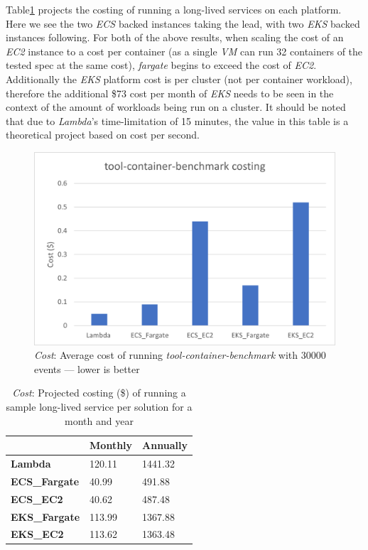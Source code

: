 Table\ref{fig:cost_projected} projects the costing of running a long-lived services on each platform. Here we see the two \textit{ECS} backed instances taking the lead,
with two \textit{EKS} backed instances following. For both of the above results, when scaling the cost of an \textit{EC2} instance to a cost per container
(as a single \textit{VM} can run 32 containers of the tested spec at the same cost), \textit{fargate} begins to exceed the cost of \textit{EC2}.
Additionally the \textit{EKS} platform cost is per cluster (not per container workload), therefore the additional \$73 cost per month of \textit{EKS} needs to be seen in the context of the amount of workloads being run on a cluster.
It should be noted that due to \textit{Lambda}'s time-limitation of 15 minutes, the value in this table is a theoretical project based on cost per second.

\begin{figure}[htbp]
  \includegraphics[width=\textwidth]{images/cost-workload.png}
  \caption{\emph{Cost}: Average cost of running \emph{tool-container-benchmark} with 30000 events --- lower is better}
  \label{fig:cost_workload}
\end{figure}

\begin{table}[htbp]
  \caption{\emph{Cost}: Projected costing (\$) of running a sample long-lived service per solution for a month and year}
  \small
  \begin{tabularx}{1\textwidth}{X | X | X }
    \space            & \bf{Monthly} & \bf{Annually} \\
    \hline
    \bf{Lambda      } & 120.11       & 1441.32       \\
    \bf{ECS\_Fargate} & 40.99        & 491.88        \\
    \bf{ECS\_EC2    } & 40.62        & 487.48        \\
    \bf{EKS\_Fargate} & 113.99       & 1367.88       \\
    \bf{EKS\_EC2    } & 113.62       & 1363.48       \\
  \end{tabularx}
  \label{fig:cost_projected}
\end{table}


